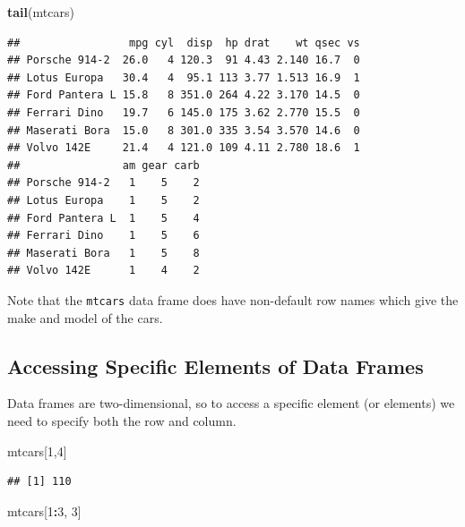 \documentclass[
]{krantz}
\newenvironment{Shaded}{\begin{snugshade}}{\end{snugshade}}
\newcommand{\DecValTok}[1]{\textcolor[rgb]{0.00,0.00,0.81}{#1}}
\newcommand{\KeywordTok}[1]{\textcolor[rgb]{0.13,0.29,0.53}{\textbf{#1}}}
\newcommand{\NormalTok}[1]{#1}
\newcommand{\OperatorTok}[1]{\textcolor[rgb]{0.81,0.36,0.00}{\textbf{#1}}}
\begin{document}
\begin{Shaded}
\begin{Highlighting}[]
\KeywordTok{tail}\NormalTok{(mtcars)}
\end{Highlighting}
\end{Shaded}

\begin{verbatim}
##                 mpg cyl  disp  hp drat    wt qsec vs
## Porsche 914-2  26.0   4 120.3  91 4.43 2.140 16.7  0
## Lotus Europa   30.4   4  95.1 113 3.77 1.513 16.9  1
## Ford Pantera L 15.8   8 351.0 264 4.22 3.170 14.5  0
## Ferrari Dino   19.7   6 145.0 175 3.62 2.770 15.5  0
## Maserati Bora  15.0   8 301.0 335 3.54 3.570 14.6  0
## Volvo 142E     21.4   4 121.0 109 4.11 2.780 18.6  1
##                am gear carb
## Porsche 914-2   1    5    2
## Lotus Europa    1    5    2
## Ford Pantera L  1    5    4
## Ferrari Dino    1    5    6
## Maserati Bora   1    5    8
## Volvo 142E      1    4    2
\end{verbatim}

Note that the \texttt{mtcars} data frame does have non-default row names which give the make and model of the cars.

\hypertarget{accessing-specific-elements-of-data-frames}{%
\subsection{Accessing Specific Elements of Data Frames}\label{accessing-specific-elements-of-data-frames}}

Data frames are two-dimensional, so to access a specific element (or elements) we need to specify both the row and column.

\begin{Shaded}
\begin{Highlighting}[]
\NormalTok{mtcars[}\DecValTok{1}\NormalTok{,}\DecValTok{4}\NormalTok{]}
\end{Highlighting}
\end{Shaded}

\begin{verbatim}
## [1] 110
\end{verbatim}

\begin{Shaded}
\begin{Highlighting}[]
\NormalTok{mtcars[}\DecValTok{1}\OperatorTok{:}\DecValTok{3}\NormalTok{, }\DecValTok{3}\NormalTok{]}
\end{Highlighting}
\end{Shaded}
\end{document}
